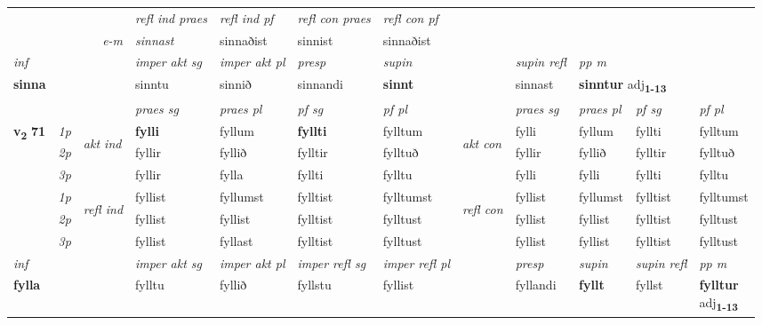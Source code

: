 \begin{longtable}[l]{X>{\footnotesize\itshape}llXXXXlXXXX}
 & && \textit{refl ind praes} & \textit{refl ind pf} & \textit{refl con praes} & \textit{refl con pf} \\*
\multicolumn{3}{r}{\textit{e-m}}& sinnast & sinnaðist & sinnist & sinnaðist \\*

\cmidrule{4-7}
   {\textit{inf}} & &  & \textit{imper akt sg} & \textit{imper akt pl}   & \textit{presp} & \textit{supin} && \textit{supin refl} & \textit{pp m} \\*
  {\textbf{sinna}} & && sinntu  & sinnið   & sinnandi &  \textbf{sinnt} && sinnast & \multicolumn{2}{l}{\textbf{sinntur} adj\textbf{\textsubscript{1-13}}} \\*

\midrule

 & &   & \textit{praes sg}  & \textit{praes pl}    & \textit{ pf sg} & \textit{pf pl} & & \textit{praes sg}  & \textit{praes pl}    & \textit{pf sg} & \textit{pf pl }  \\ \cmidrule{4-7} \cmidrule{9-12}
 \multirow{2}{*}{{{\textbf{v{\textsubscript{2}}} \Large{\textbf{71}}}}}  & 1p & \multirow{3}{*}{\begin{turn}{90}\textit{akt ind}\end{turn}} & \textbf{fylli} & fyllum & \textbf{fyllti} & fylltum & \multirow{3}{*}{\begin{turn}{90}\textit{akt con}\end{turn}} &fylli & fyllum & fyllti & fylltum\\*
 & 2p &  &  fyllir  & fyllið & fylltir & fylltuð & & fyllir & fyllið & fylltir & fylltuð \\*
 & 3p &  & fyllir & fylla & fyllti & fylltu & & fylli & fylli& fyllti & fylltu \\*
\cmidrule{4-7} \cmidrule{9-12}
 & 1p & \multirow{3}{*}{\begin{turn}{90}\textit{refl ind}\end{turn}}  & fyllist & fyllumst & fylltist & fylltumst & \multirow{3}{*}{\begin{turn}{90}\textit{refl con}\end{turn}}  &fyllist & fyllumst & fylltist & fylltumst \\*
 & 2p &  & fyllist & fyllist & fylltist & fylltust & &fyllist & fyllist & fylltist & fylltust \\*
 & 3p  & & fyllist & fyllast & fylltist & fylltust & & fyllist & fyllist& fylltist & fylltust \\*
\cmidrule{4-7} \cmidrule{9-12}

   {\textit{inf}} & &  & \textit{imper akt sg} & \textit{imper akt pl} & \textit{imper refl sg} & \textit{imper refl pl} && \textit{presp} & \textit{supin} & \textit{supin refl} & \textit{pp m} \\*
  {\textbf{fylla}} & && fylltu  & fyllið & fyllstu & fyllist && fyllandi &  \textbf{fyllt} & fyllst & \specialcell{\textbf{fylltur} \\ adj\textbf{\textsubscript{1-13}}} \\*


\end{longtable}

